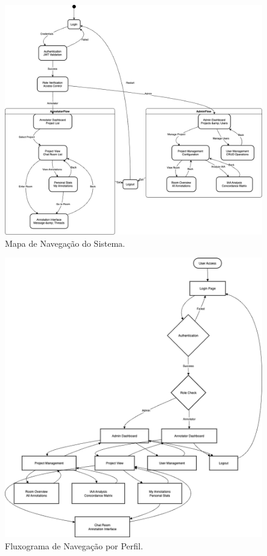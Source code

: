 \begin{landscape}
    \begin{figure}[p]
        \centering
        \includegraphics[width=0.9\linewidth, height=0.85\textheight, keepaspectratio]{images/3-mapa-de-navegacao-do-sistema.png}
        \caption{Mapa de Navegação do Sistema.}
        \label{fig:mapa-navegacao}
    \end{figure}
\end{landscape}

\begin{landscape}
    \begin{figure}[p]
        \centering
        \includegraphics[width=0.9\linewidth, height=0.85\textheight, keepaspectratio]{images/3-fluxograma-de-navegacao-por-perfil.png}
        \caption{Fluxograma de Navegação por Perfil.}
        \label{fig:fluxograma-navegacao-perfil}
    \end{figure}
\end{landscape}

